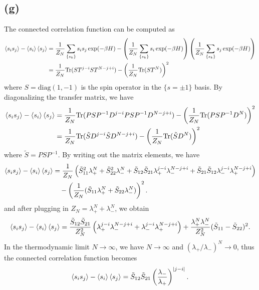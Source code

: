 \documentclass{article}
\begin{document}
\subsection*{(g)}
The connected correlation function can be computed as
\begin{equation}
    \begin{split}
        \ev{s_i s_j}-\ev{s_i}\ev{s_j}&=\frac{1}{Z_N}\sum_{\{s_k\}} s_i s_j \exp(-\beta H)-\left(\frac{1}{Z_N}\sum_{\{s_k\}} s_i \exp(-\beta H)\right)\left(\frac{1}{Z_N}\sum_{\{s_k\}} s_j \exp(-\beta H)\right)\\
                                     &=\frac{1}{Z_N}\text{Tr}(S T^{j-i} S T^{N-j+i})-\left(\frac{1}{Z_N}\text{Tr}(S T^N)\right)^2
    \end{split}
\end{equation}
where $S=\text{diag}(1,-1)$ is the spin operator in the $\{s=\pm 1\}$ basis.
By diagonalizing the transfer matrix, we have
\begin{equation}
    \begin{split}
        \ev{s_i s_j}-\ev{s_i}\ev{s_j}&=\frac{1}{Z_N}\text{Tr}(P S P^{-1} D^{j-i} P S P^{-1} D^{N-j+i})-\left(\frac{1}{Z_N}\text{Tr}(P S P^{-1} D^N)\right)^2\\
                                     &=\frac{1}{Z_N}\text{Tr}(\tilde{S} D^{j-i} \tilde{S} D^{N-j+i})-\left(\frac{1}{Z_N}\text{Tr}(\tilde{S} D^N)\right)^2
    \end{split}
\end{equation}
where $\tilde{S}=P S P^{-1}$.
By writing out the matrix elements, we have
\begin{equation}
    \begin{split}
        \ev{s_i s_j}-\ev{s_i}\ev{s_j}&=\frac{1}{Z_N}\left(\tilde{S}_{11}^2 \lambda_+^N+\tilde{S}_{22}^2 \lambda_-^N+\tilde{S}_{12}\tilde{S}_{21}\lambda_+^{j-i}\lambda_-^{N-j+i}+\tilde{S}_{21}\tilde{S}_{12}\lambda_-^{j-i}\lambda_+^{N-j+i}\right)\\
                                     &\quad -\left(\frac{1}{Z_N}(\tilde{S}_{11}\lambda_+^N+\tilde{S}_{22}\lambda_-^N)\right)^2.
    \end{split}
\end{equation}
and after plugging in $Z_N=\lambda_+^N+\lambda_-^N$, we obtain
\begin{equation}
    \ev{s_i s_j}-\ev{s_i}\ev{s_j}=\frac{\tilde{S}_{12}\tilde{S}_{21}}{Z_N^2}\left(\lambda_+^{j-i}\lambda_-^{N-j+i}+\lambda_-^{j-i}\lambda_+^{N-j+i}\right)+\frac{\lambda_+^N \lambda_-^N}{Z_N^2}(\tilde{S}_{11}-\tilde{S}_{22})^2.
\end{equation}
In the thermodynamic limit $N\to\infty$, we have $N\to\infty$ and $(\lambda_+/\lambda_-)^N\to 0$, thus the connected correlation function becomes
\begin{equation}
    \ev{s_i s_j}-\ev{s_i}\ev{s_j}=\tilde{S}_{12}\tilde{S}_{21}\left(\frac{\lambda_-}{\lambda_+}\right)^{|j-i|}.
\end{equation}



%
%
\end{document}
